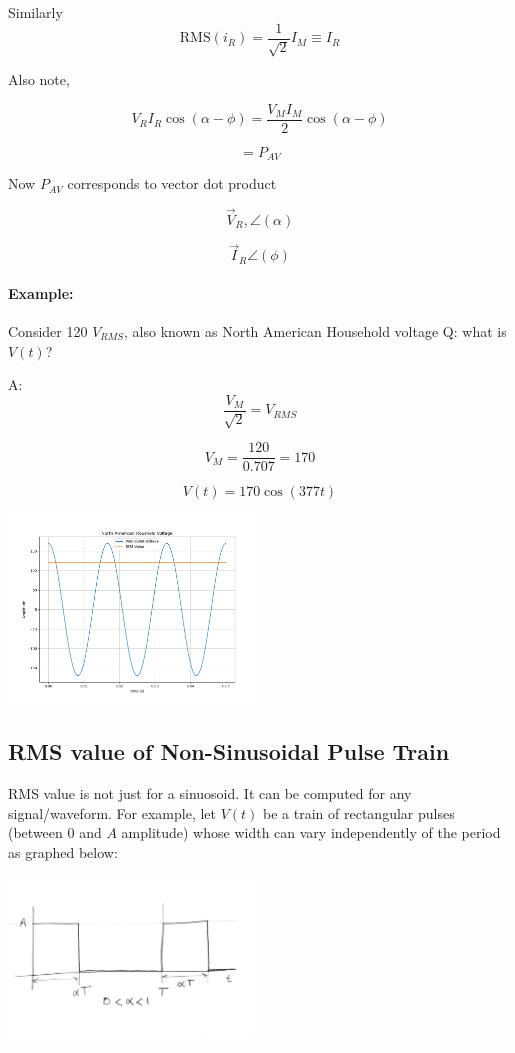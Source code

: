 Similarly
\[
\text{RMS}(i_R) = \frac{1}{\sqrt{2}} I_M \equiv I_R
\]

\noindent Also note,

\[
V_R I_R \cos(\alpha - \phi) = \frac{V_M I_M}{2} \cos(\alpha - \phi)
\]

\[
= P_{AV}
\]



\noindent Now $P_{AV}$ corresponds to vector dot product


\[
\vec{V}_R, \angle(\alpha)
\]

\[
\vec{I}_R \angle(\phi)
\]


\paragraph{Example:}  Consider
120 $V_{RMS}$, also known as North American Household voltage
\vspace{0.25in}
\noindent Q: what is $V(t)$?
\vspace{0.25in}

\noindent A:
\[
\frac{V_M}{\sqrt{2}} = V_{RMS}
\]

\[
V_M = \frac{ 120 } {0.707} = 170
\]

\[
V(t) = 170 \cos(377t)
\]

\includegraphics[width=0.5\textwidth]{figsChapt03/FM67804.png}



\subsection{RMS value of Non-Sinusoidal Pulse Train}
RMS value is not just for a sinuosoid.  It can be computed for any signal/waveform.
For example, let $V(t)$ be a train of rectangular pulses (between 0 and $A$ amplitude)
whose width can vary
independently of the period   as graphed below:


\includegraphics[width=0.5\textwidth]{figsChapt03/HT21139.png}


